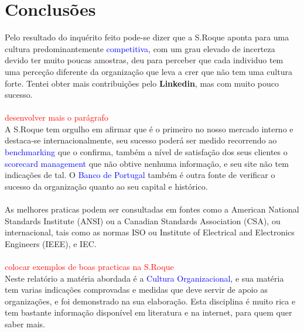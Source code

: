 \section{Conclusões}
\qquad Pelo resultado do inquérito feito pode-se dizer que a S.Roque aponta para uma cultura predominantemente \textcolor{blue}{competitiva}, com um grau elevado de incerteza devido ter muito poucas amostras, deu para perceber que cada individuo tem uma perceção diferente da organização que leva a crer que não tem uma cultura forte. Tentei obter mais contribuições pelo \textbf{Linkedin}, mas com muito pouco sucesso. \\
\\
\textcolor{red}{desenvolver mais o parágrafo}\\
A S.Roque tem orgulho em afirmar que é o primeiro no nosso mercado interno e destaca-se internacionalmente, seu sucesso poderá ser medido recorrendo ao \textcolor{blue}{benchmarking} que o confirma, também a nível de satisfação dos seus clientes o \textcolor{blue}{scorecard management} que não obtive nenhuma informação, e seu site não tem indicações de tal. O \textcolor{blue}{Banco de Portugal} também é outra fonte de verificar o sucesso da organização quanto ao seu capital e histórico. \\
\\
As melhores praticas podem ser consultadas em fontes como a American National Standards Institute (ANSI) ou a Canadian Standards Association (CSA), ou internacional, tais como as normas ISO ou Institute of Electrical and Electronics Engineers (IEEE), e IEC. \\
\\
\textcolor{red}{colocar exemplos de boas practicas na S.Roque}\\
Neste relatório a matéria abordada é a \textcolor{blue}{Cultura Organizacional}, e sua matéria tem varias indicações comprovadas e medidas que deve servir de apoio as organizações, e foi demonstrado na sua elaboração. Esta disciplina é muito rica e tem bastante informação disponível em literatura e na internet, para quem quer saber mais.
